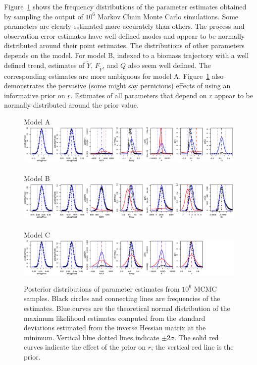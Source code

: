 \documentclass[12pt,letterpaper]{article}
\newcommand\MSY{\widetilde{Y}}
\newcommand\Fmsy{F_{\MSY}}
\begin{document}
Figure~\ref{fig:posteriors} shows the frequency distributions of the
parameter estimates obtained by sampling the output of $10^6$ Markov
Chain Monte Carlo simulations. Some parameters are clearly estimated
more accurately than others. The process and observation error
estimates have well defined modes and appear to be normally
distributed around their point estimates. The distributions of other
parameters depends on the model. For model B, indexed to a
biomass trajectory with a well defined trend, estimates of $\MSY$,
$\Fmsy$, and $Q$ also seem well defined.
The corresponding estimates are more ambiguous for model A.
Figure~\ref{fig:posteriors} also demonstrates the pervasive (some
might say pernicious) effects of using an informative prior on $r$. Estimates
of all parameters that depend on $r$ appear to be normally
distributed around the prior value.

\begin{figure}
\begin{center}
{\sffamily
Model A\\
\includegraphics[width=1.00\textwidth]{./4-gear-runs_r2_mcmc_posterior_row.pdf}\\
~\\
Model B\\
\includegraphics[width=1.00\textwidth]{./4-gear-runs_r4_mcmc_posterior_row.pdf}\\
~\\
Model C\\
\includegraphics[width=1.00\textwidth]{./4-gear-runs_r0-sdrprior_mcmc_posterior_row.pdf}\\
}
\end{center}
\caption{Posterior distributions of parameter estimates from $10^6$
MCMC samples. 
Black circles and connecting lines are frequencies of the estimates.
Blue curves are the theoretical normal distribution of the maximum
likelihood estimates computed from the standard deviations estimated
from the inverse Hessian matrix at the minimum. 
Vertical blue dotted lines indicate $\pm 2\sigma$.
The solid red curves indicate the effect of the prior on $r$; the
vertical red line is the prior.
\label{fig:posteriors}}
\end{figure}
\end{document}
